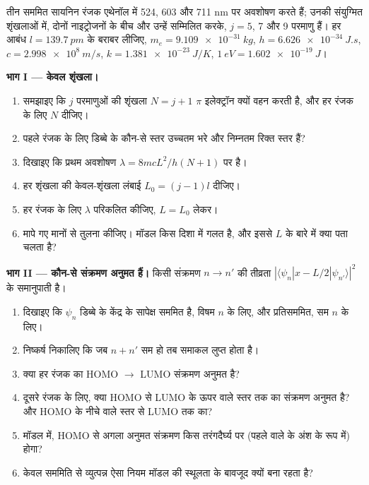 \begin{problem}
\label{pb:b3:quantum-model-systems:1}
तीन सममित सायनिन रंजक एथेनॉल में 524, 603 और 711 nm पर अवशोषण करते हैं; उनकी
संयुग्मित शृंखलाओं में, दोनों नाइट्रोजनों के बीच और उन्हें सम्मिलित करके, $j = 5$, 7
और 9 परमाणु हैं। हर आबंध $l = \qty{139.7}{pm}$ के बराबर लीजिए, $m_e =
\qty{9.109e-31}{kg}$, $h = \qty{6.626e-34}{J.s}$, $c = \qty{2.998e8}{m/s}$,
$k = \qty{1.381e-23}{J/K}$, $\qty{1}{eV} = \qty{1.602e-19}{J}$।

\medskip\noindent\textbf{भाग I --- केवल शृंखला।}
\begin{enumerate}
  \item समझाइए कि $j$ परमाणुओं की शृंखला $N = j + 1$ $\pi$ इलेक्ट्रॉन क्यों वहन करती है, और
        हर रंजक के लिए $N$ दीजिए।
  \item पहले रंजक के लिए डिब्बे के कौन-से स्तर उच्चतम भरे और निम्नतम रिक्त
        स्तर हैं?
  \item दिखाइए कि प्रथम अवशोषण $\lambda = 8mcL^2/h(N+1)$ पर है।
  \item हर शृंखला की केवल-शृंखला लंबाई $L_0 = (j - 1)l$ दीजिए।
  \item हर रंजक के लिए $\lambda$ परिकलित कीजिए, $L = L_0$ लेकर।
  \item मापे गए मानों से तुलना कीजिए। मॉडल किस दिशा में गलत है,
        और इससे $L$ के बारे में क्या पता चलता है?
\end{enumerate}

\medskip\noindent\textbf{भाग II --- कौन-से संक्रमण अनुमत हैं।}
किसी संक्रमण $n \to n'$ की तीव्रता $|\langle
\psi_n|x - L/2|\psi_{n'}\rangle|^2$ के समानुपाती है।
\begin{enumerate}[resume]
  \item दिखाइए कि $\psi_n$ डिब्बे के केंद्र के सापेक्ष सममित है, विषम
        $n$ के लिए, और प्रतिसममित, सम $n$ के लिए।
  \item निष्कर्ष निकालिए कि जब $n + n'$ सम हो तब समाकल लुप्त होता है।
  \item क्या हर रंजक का HOMO $\to$ LUMO संक्रमण अनुमत है?
  \item दूसरे रंजक के लिए, क्या HOMO से LUMO के ऊपर वाले स्तर तक का संक्रमण
        अनुमत है? और HOMO के नीचे वाले स्तर से LUMO तक का?
  \item मॉडल में, HOMO से अगला अनुमत संक्रमण किस तरंगदैर्घ्य पर (पहले वाले के
        अंश के रूप में) होगा?
  \item केवल सममिति से व्युत्पन्न ऐसा नियम मॉडल की स्थूलता के बावजूद क्यों
        बना रहता है?
\end{enumerate}


\end{problem}

